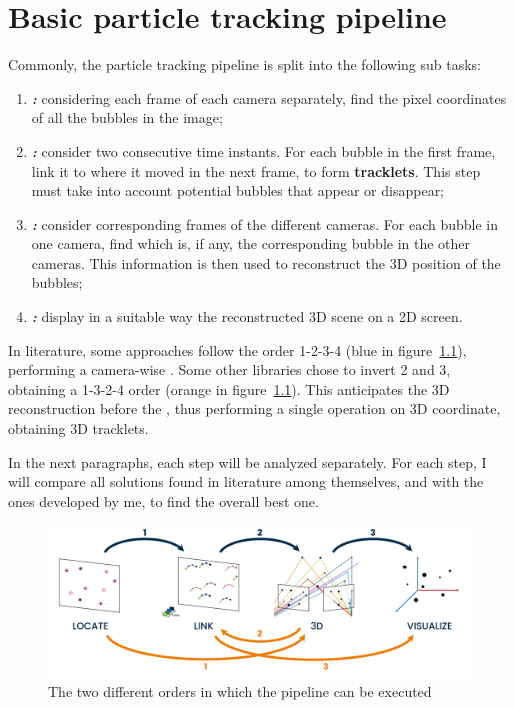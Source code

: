 \chapter{Basic particle tracking pipeline}
\label{chap:basicpipeline}

Commonly, the particle tracking pipeline is split into the following sub tasks:
\begin{enumerate}
	\itemsep 0em
	\item \textbf{\locate* \textit{:}} considering each frame of each camera separately, find the pixel coordinates of all the bubbles in the image;
	\item \textbf{\link* \textit{:}} consider two consecutive time instants. For each bubble in the first frame, link it to where it moved in the next frame, to form \textbf{tracklets}. This step must take into account potential bubbles that appear or disappear;
	\item \textbf{\match* \textit{:}} consider corresponding frames of the different cameras. For each bubble in one camera, find which is, if any, the corresponding bubble in the other cameras. This information is then used to reconstruct the 3D position of the bubbles;
	\item \textbf{\visual* \textit{:}} display in a suitable way the reconstructed 3D scene on a 2D screen.
\end{enumerate}
In literature, some approaches follow the order 1-2-3-4 (blue in figure~\ref{fig:pipeline:order}), performing a camera-wise \link*.
Some other libraries chose to invert 2 and 3, obtaining a 1-3-2-4 order (orange in figure~\ref{fig:pipeline:order}).
This anticipates the 3D reconstruction before the \link*, thus performing a single \link* operation on 3D coordinate, obtaining 3D tracklets.

In the next paragraphs, each step will be analyzed separately.
For each step, I will compare all solutions found in literature among themselves, and with the ones developed by me, to find the overall best one.

\begin{figure}
	\centerline{\includegraphics[width=\textwidth]{images/pipeline-orders.png}}
	\caption{\centering The two different orders in which the pipeline can be executed}
	\label{fig:pipeline:order}
\end{figure}
